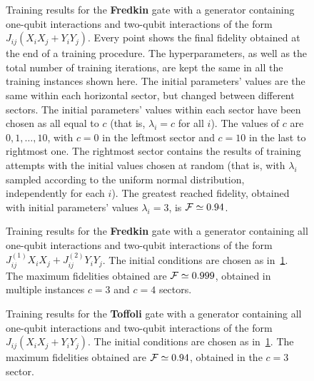 \begin{figure}[tb]
	\centering
    \vspace{-40pt}
	\caption{
		Training results for the \textbf{Fredkin} gate with a generator containing one-qubit interactions and two-qubit interactions of the form $J_{ij}(X_i X_j + Y_i Y_j)$.
		Every point shows the final fidelity obtained at the end of a training procedure.
		The hyperparameters, as well as the total number of training iterations, are kept the same in all the training instances shown here.
		The initial parameters' values are the same within each horizontal sector, but changed between different sectors.
		The initial parameters' values within each sector have been chosen as all equal to $c$ (that is, $\lambda_i=c$ for all $i$). The values of $c$ are $0, 1,\ldots, 10$, with $c=0$ in the leftmost sector and $c=10$ in the last to rightmost one.
		The rightmost sector contains the results of training attempts with the initial values chosen at random (that is, with $\lambda_i$ sampled according to the uniform normal distribution, independently for each $i$).
		The greatest reached fidelity, obtained with initial parameters' values $\lambda_i=3$, is ${\mathcal{F}}\simeq0.94$.
	}
\label{fig:fredkin_XX}
\end{figure}

\begin{figure}[tb]
	\centering
	\caption{
		Training results for the \textbf{Fredkin} gate with a generator containing all one-qubit interactions and two-qubit interactions of the form $J^{(1)}_{ij}X_i X_j + J^{(2)}_{ij}Y_i Y_j$.
		The initial conditions are chosen as in~\cref{fig:fredkin_XX}.
		The maximum fidelities obtained are ${\mathcal{F}}\simeq0.999$, obtained in multiple instances $c=3$ and $c=4$ sectors.
	}
\label{fig:fredkin_XY}
\end{figure}

\begin{figure}[tb]
	\centering
	\caption{
		Training results for the \textbf{Toffoli} gate with a generator containing all one-qubit interactions and two-qubit interactions of the form $J_{ij}(X_i X_j + Y_i Y_j)$.
		The initial conditions are chosen as in~\cref{fig:fredkin_XX}.
		The maximum fidelities obtained are ${\mathcal{F}}\simeq0.94$, obtained in the $c=3$ sector.
	}
	\label{fig:toffoli_XX}
\end{figure}

